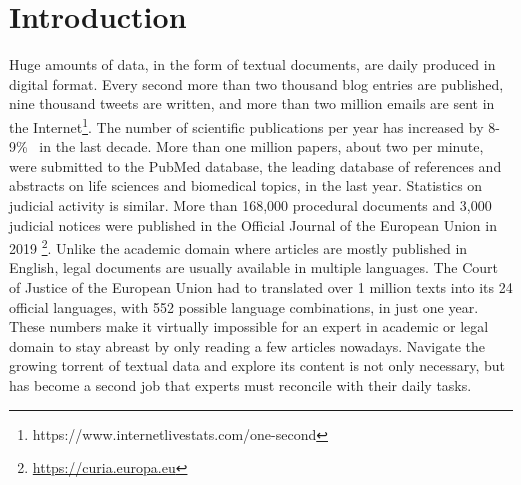 

\chapter{Introduction}\label{ch:introduction}

\graphicspath{{introduction/figures/}}




Huge amounts of data, in the form of textual documents, are daily produced in digital format. Every second more than two thousand blog entries are published, nine thousand tweets are written, and more than two million emails are sent in the Internet\footnote{https://www.internetlivestats.com/one-second}. The number of scientific publications per year has increased by 8-9\%~ in the last decade\citep{Ware2018STM}. More than one million papers, about two per minute,  were submitted to the PubMed database, the leading database of references and abstracts on life sciences and biomedical topics, in the last year. Statistics on judicial activity is similar. More than 168,000 procedural documents and 3,000 judicial notices were published in the Official Journal of the European Union in 2019 \footnote{\url{https://curia.europa.eu}}. Unlike the academic domain where articles are mostly published in English, legal documents are usually available in multiple languages. The Court of Justice of the European Union had to translated over 1 million texts into its 24 official languages, with 552 possible language combinations, in just one year. These numbers make it virtually impossible for an expert in academic or legal domain to stay abreast by only reading a few articles nowadays. Navigate the growing torrent of textual data and explore its content is not only necessary, but has become a second job that experts must reconcile with their daily tasks. 

